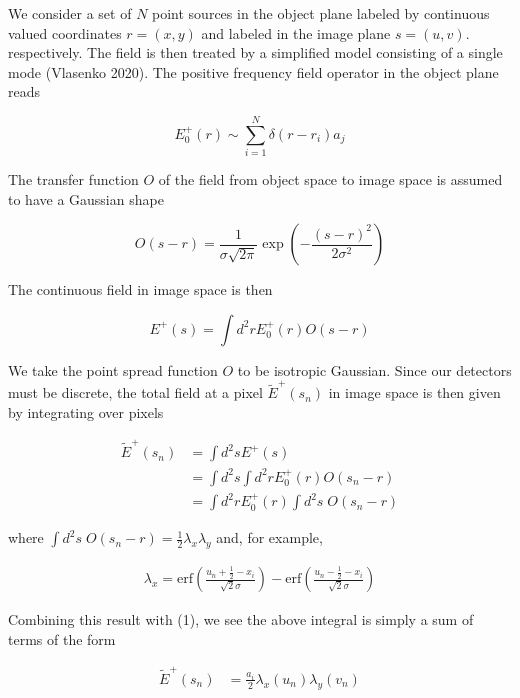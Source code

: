 \documentclass[a4paper, twocolumn, superscriptaddress,prl]{revtex4}  %
\begin{document}
We consider a set of $N$ point sources in the object plane labeled by continuous valued coordinates $r=(x,y)$ and labeled in the image plane $s=(u,v)$.  respectively. The field is then treated by a simplified model consisting of a single mode (Vlasenko 2020). The positive frequency field operator in the object plane reads

\begin{equation}
E_{0}^{+}(r) \sim \sum_{i=1}^{N}\delta(r-r_{i})a_{j}
\end{equation}

The transfer function $O$ of the field from object space to image space is assumed to have a Gaussian shape

\begin{equation}
O(s-r) = \frac{1}{\sigma\sqrt{2\pi}}\exp\left(-\frac{(s-r)^2}{2\sigma^2}\right)
\end{equation}

The continuous field in image space is then 

\begin{equation*}
E^{+}(s) =  \int d^2 r E_{0}^{+}(r) O(s-r)
\end{equation*}

We take the point spread function $O$ to be isotropic Gaussian. Since our detectors must be discrete, the total field at a pixel $\tilde{E}^{+}(s_{n})$ in image space is then given by integrating over pixels

\begin{align*}
\tilde{E}^{+}(s_{n}) &=  \int d^2 s E^{+}(s) \\
&=  \int d^2 s \int d^2 r E_{0}^{+}(r) O(s_n-r)\\
&=  \int d^2 r E_{0}^{+}(r) \int d^2 s \; O(s_n-r)
\end{align*}

where $\int d^2 s \; O(s_n-r) = \frac{1}{2}\lambda_{x} \lambda_{y}$ and, for example,

\begin{align*}
\lambda_{x} = \mathrm{erf}\left(\frac{u_n+\frac{1}{2}-x_i}{\sqrt{2}\sigma}\right) -\mathrm{erf}\left(\frac{u_n-\frac{1}{2}-x_i}{\sqrt{2}\sigma}\right)
\end{align*}


Combining this result with (1), we see the above integral is simply a sum of terms of the form

\begin{align*}
\tilde{E}^{+}(s_{n}) &=  \frac{a_{i}}{2}\lambda_{x}(u_n) \lambda_{y}(v_n)
\end{align*}
\end{document}
